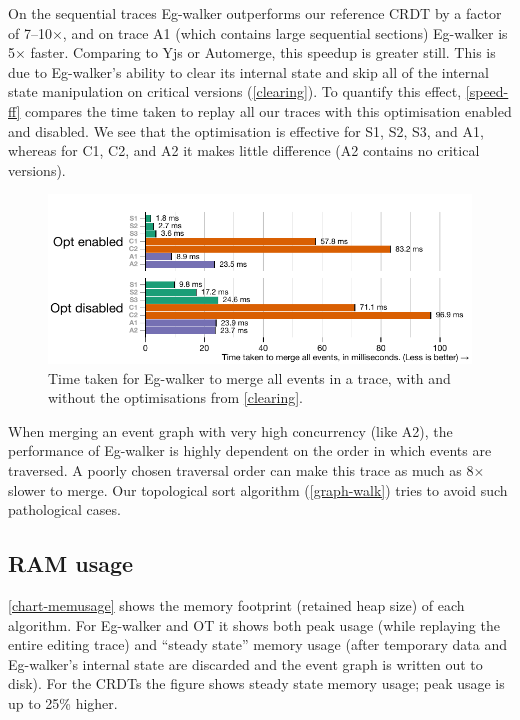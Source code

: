 \documentclass[sigplan,10pt]{acmart}
\newcommand{\algname}{Eg-walker\xspace}
\begin{document}
On the sequential traces \algname outperforms our reference CRDT by a factor of 7--10$\times$, and on trace A1 (which contains large sequential sections) \algname is 5$\times$ faster.
Comparing to Yjs or Automerge, this speedup is greater still.
This is due to \algname's ability to clear its internal state and skip all of the internal state manipulation on critical versions (\autoref{clearing}).
To quantify this effect, \autoref{speed-ff} compares the time taken to replay all our traces with this optimisation enabled and disabled.
We see that the optimisation is effective for S1, S2, S3, and A1, whereas for C1, C2, and A2 it makes little difference (A2 contains no critical versions).

\begin{figure}
  \includegraphics[width=\linewidth]{diagrams/ff.pdf}
  \caption{Time taken for \algname to merge all events in a trace, with and without the optimisations from \autoref{clearing}.}
  \label{speed-ff}
\end{figure}


When merging an event graph with very high concurrency (like A2), the performance of \algname is highly dependent on the order in which events are traversed.
A poorly chosen traversal order can make this trace as much as 8$\times$ slower to merge. Our topological sort algorithm (\autoref{graph-walk}) tries to avoid such pathological cases.

\subsection{RAM usage}

\autoref{chart-memusage} shows the memory footprint (retained heap size) of each algorithm.
For \algname and OT it shows both peak usage (while replaying the entire editing trace) and ``steady state'' memory usage (after temporary data and \algname's internal state are discarded and the event graph is written out to disk).
For the CRDTs the figure shows steady state memory usage; peak usage is up to 25\% higher.
\end{document}
